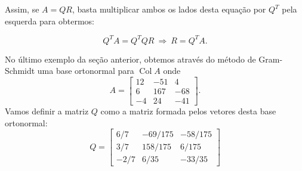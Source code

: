 \documentclass[../livro.tex]{subfiles}  %
\begin{document}
Assim, se $A=QR$, basta multiplicar ambos os lados desta equação por $Q^T$ pela esquerda para obtermos:

\begin{equation}Q^T A = Q^T Q R \ \Longrightarrow \ R= Q^T A.\end{equation}






\vspace{0.3cm}



No último exemplo da seção anterior, obtemos através do método de Gram-Schmidt uma base ortonormal para $\operatorname{Col} A$
onde 
\begin{equation}
A =
\begin{bmatrix}
12 & -51 & 4 \\
6 & 167 & -68 \\
-4 & 24 & -41
\end{bmatrix}.
\end{equation}
Vamos definir a matriz $Q$ como a matriz formada pelos vetores desta base ortonormal:
\begin{equation}
Q =
\begin{bmatrix}
6/7 & -69/175 & -58/175 \\
3/7 & 158/175 & 6/175   \\
-2/7& 6/35   &-33/35
\end{bmatrix}
\end{equation} 
\end{document}
